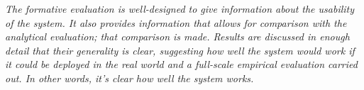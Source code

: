 \documentclass[conference]{IEEEtran}
\begin{document}
\emph{The formative evaluation is well-designed to give information about the usability of the system. It also provides information that allows for comparison with the analytical evaluation; that comparison is made. Results are discussed in enough detail that their generality is clear, suggesting how well the system would work if it could be deployed in the real world and a full-scale empirical evaluation carried out. In other words, it's clear how well the system works.}


%
%



%
%
\end{document}
